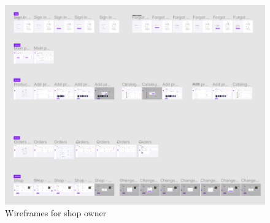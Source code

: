 \begin{figure}[h]
    \centering
    \includegraphics[scale=0.53]{figures/image005.png}
    \caption{Wireframes for shop owner}
    \label{fig:image005}
\end{figure}
